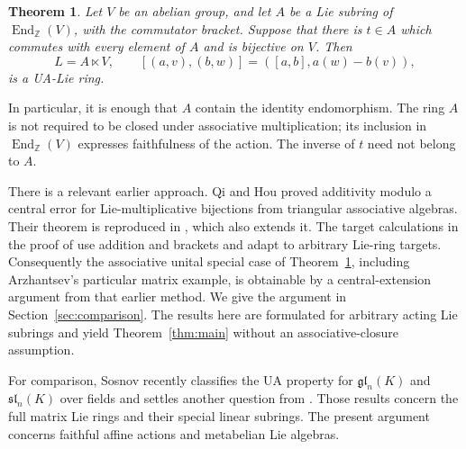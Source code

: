 \documentclass[11pt]{article}
\newtheorem{theorem}{Theorem}
\theoremstyle{definition}
\DeclareMathOperator{\End}{End}
\begin{document}
\begin{theorem}\label{thm:affine}
Let $V$ be an abelian group, and let $A$ be a Lie subring of $\End_{\mathbb Z}(V)$, with the commutator bracket. Suppose that there is $t\in A$ which commutes with every element of $A$ and is bijective on $V$. Then
\[
 L=A\ltimes V,\qquad
 [(a,v),(b,w)]=([a,b],a(w)-b(v)),
\]
is a UA-Lie ring.
\end{theorem}

In particular, it is enough that $A$ contain the identity endomorphism. The ring $A$ is not required to be closed under associative multiplication; its inclusion in $\End_{\mathbb Z}(V)$ expresses faithfulness of the action. The inverse of $t$ need not belong to $A$.

There is a relevant earlier approach. Qi and Hou \cite{QH} proved additivity modulo a central error for Lie-multiplicative bijections from triangular associative algebras. Their theorem is reproduced in \cite[Theorem~1.1]{FG}, which also extends it. The target calculations in the proof of \cite[Theorem~4.1, $n=2$]{FG} use addition and brackets and adapt to arbitrary Lie-ring targets. Consequently the associative unital special case of Theorem~\ref{thm:affine}, including Arzhantsev's particular matrix example, is obtainable by a central-extension argument from that earlier method. We give the argument in Section~\ref{sec:comparison}. The results here are formulated for arbitrary acting Lie subrings and yield Theorem~\ref{thm:main} without an associative-closure assumption.

For comparison, Sosnov \cite{Sos} recently classifies the UA property for $\mathfrak{gl}_n(K)$ and $\mathfrak{sl}_n(K)$ over fields and settles another question from \cite{Arz}. Those results concern the full matrix Lie rings and their special linear subrings. The present argument concerns faithful affine actions and metabelian Lie algebras.
\end{document}
